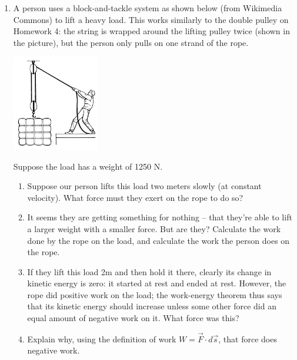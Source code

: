 \documentclass[12pt]{article}
\begin{document}
\begin{enumerate}
%	


\item{A person uses a block-and-tackle system as shown below (from Wikimedia Commons) to lift a heavy load. This works similarly to the double pulley on Homework 4: the string is wrapped around the lifting pulley twice (shown in the picture), but the 
	person only pulls on one strand of the rope.
	
	\includegraphics[width=0.3\textwidth]{blockandtackle.png}
	
	Suppose the load has a weight of 1250 N. 
	
	\begin{enumerate}
		\item{Suppose our person lifts this load two meters slowly (at constant velocity). What force must they exert on the rope to do so?} 
		\item{It seems they are getting something for nothing -- that they're able to lift a larger weight with a smaller force. But are they? Calculate the work done by the rope on the load, and calculate the work the person does on the rope.}
		\item{If they lift this load 2m and then hold it there, clearly its change in kinetic energy is zero: it started at rest and ended at rest. However, the rope did positive work on the load; the work-energy theorem thus says that its kinetic energy should
			increase unless some other force did an equal amount of negative work on it. What force was this?}
		\item{Explain why, using the definition of work $W = \vec F \cdot d\vec s$, that force does negative work.}
	\end{enumerate}
}


\end{enumerate}
\end{document}
